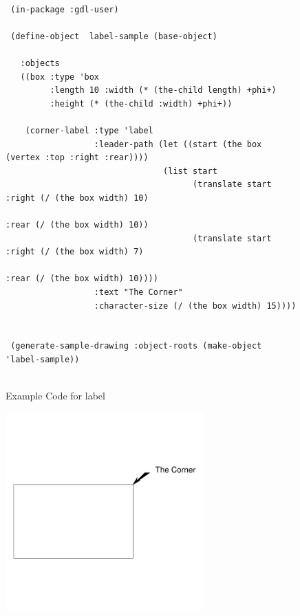 \documentclass [11pt]{book}
\begin{document}
\begin{itemize}
\begin{description}
\end{description}




\begin{figure}
\begin{lrbox}{\boxedverb}
\begin{minipage}{\linewidth}
{\small

\begin{verbatim}        

 (in-package :gdl-user)
                   
 (define-object  label-sample (base-object)
  
   :objects
   ((box :type 'box
         :length 10 :width (* (the-child length) +phi+)
         :height (* (the-child :width) +phi+))
   
    (corner-label :type 'label
                  :leader-path (let ((start (the box (vertex :top :right :rear))))
                                (list start
                                      (translate start :right (/ (the box width) 10)
                                                       :rear (/ (the box width) 10))
                                      (translate start :right (/ (the box width) 7)
                                                       :rear (/ (the box width) 10))))
                  :text "The Corner"
                  :character-size (/ (the box width) 15))))


 (generate-sample-drawing :object-roots (make-object 'label-sample))


\end{verbatim}}
\end{minipage}
\end{lrbox}
\fbox{\usebox{\boxedverb}}

\caption{Example Code for label}

\label{fig:example-code-label}

\end{figure}

\begin{figure}
\begin{center}
\includegraphics[width=3in,height=3in]{../images/example-label.pdf}
\end{center}


\end{figure}
\end{itemize}
\end{document}
